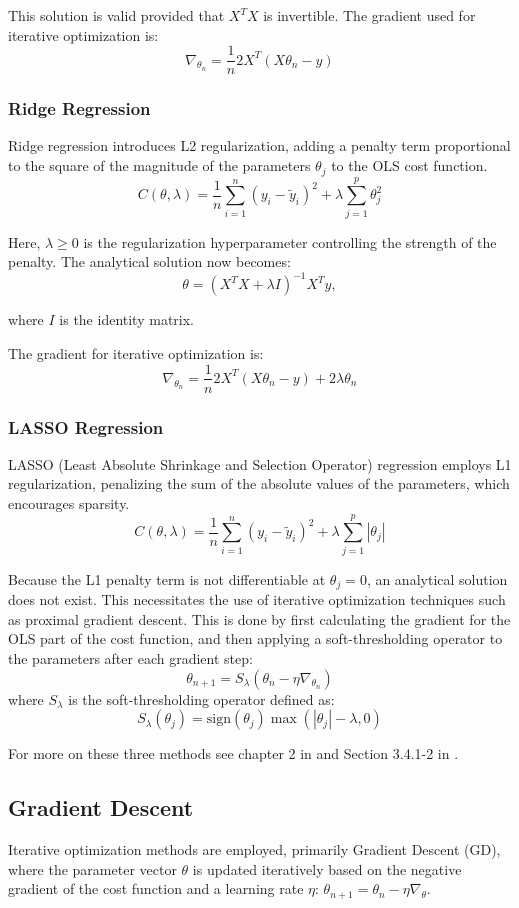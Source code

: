 \documentclass[twocolumn,aps]{revtex4}
\begin{document}
This solution is valid provided that $X^TX$ is invertible. The gradient used for iterative optimization is:
$$\nabla_{\theta_n}=\frac{1}{n}2X^T(X\theta_n-y)$$



\subsubsection{Ridge Regression}
Ridge regression introduces L2 regularization, adding a penalty term proportional to the square of the magnitude of the parameters $\theta_j$ to the OLS cost function.
$$
C(\theta, \lambda) = \frac{1}{n} \sum_{i=1}^{n} (y_i - \tilde{y}_i)^2 + \lambda \sum_{j=1}^{p} \theta_j^2
$$

Here, $\lambda \geq 0$ is the regularization hyperparameter controlling the strength of the penalty. 
The analytical solution now becomes:
$$
\theta=(X^TX+\lambda I)^{-1}X^Ty,
$$

where $I$ is the identity matrix.

The gradient for iterative optimization is:
$$
\nabla_{\theta_n}=\frac{1}{n}2X^T(X\theta_n-y)+2\lambda\theta_n
$$


\subsubsection{LASSO Regression}
LASSO (Least Absolute Shrinkage and Selection Operator) regression employs L1 regularization, penalizing the sum of the absolute values of the parameters, which encourages sparsity.
$$
C(\theta, \lambda)=\frac{1}{n}\sum_{i=1}^{n}(y_i-\tilde{y}_i)^2+\lambda\sum_{j=1}^{p}|\theta_j|
$$

Because the L1 penalty term is not differentiable at $\theta_j=0$, an analytical solution does not exist. 
This necessitates the use of iterative optimization techniques such as proximal gradient descent.
This is done by first calculating the gradient for the OLS part of the cost function, and then applying a soft-thresholding operator to the parameters after each gradient step:
$$\theta_{n+1} = S_{\lambda}(\theta_n - \eta \nabla_{\theta_n})$$
where $S_{\lambda}$ is the soft-thresholding operator defined as:
$$S_{\lambda}(\theta_j) = \text{sign}(\theta_j) \max(|\theta_j| - \lambda, 0)$$

For more on these three methods see chapter 2 in \cite{compfys} and Section 3.4.1-2 in \cite{hastie}.
\subsection{Gradient Descent}
Iterative optimization methods are employed, primarily Gradient Descent (GD), where the parameter vector $\theta$ is updated iteratively based on the negative gradient of the cost function and a learning rate $\eta$: $\theta_{n+1}=\theta_n-\eta\nabla_{\theta}$.
\end{document}
